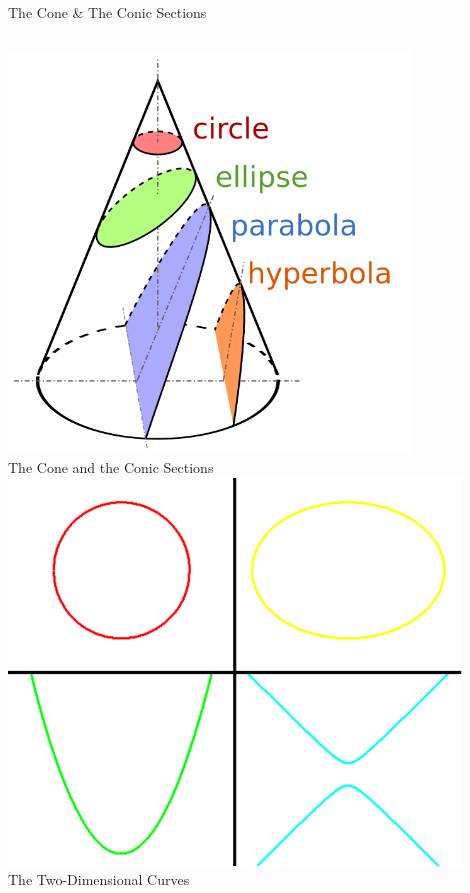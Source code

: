 \documentclass[14pt,aspectratio=169]{beamer}
\begin{document}
\begin{frame}{The Cone \& The Conic Sections}
 \begin{columns}
    \centering
     \includegraphics[width=0.8\textwidth]{image04.png} \\
     The Cone and the Conic Sections
    \centering
    \includegraphics[width=0.9\textwidth]{image03.png}\\
    The Two-Dimensional Curves

 \end{columns}

\end{frame}
\end{document}
